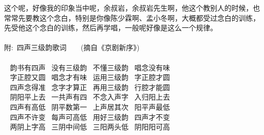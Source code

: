 \textrm{这个呢，好像我的印象当中呢，余叔岩，余叔岩先生啊，他这个教别人的时候，也常常先要教这个念白，特别是你像陈少霖啊、孟小冬啊，大概都受过念白的训练，先受他这个念白的训练，然后再学唱，一般呢好像是这么一个规律。}\\
\\
\vspace{7pt}
{\hei 附:~四声三级韵歌词~~~~(摘自《京剧新序》)}\\%
\vspace{3pt}
{\hei 
\\
\hspace*{50pt}~ 韵书有四声~\hspace{40pt} 没有三级韵~\hspace{40pt} 不懂三级韵~\hspace{40pt} 唱念没有味\\ 
\hspace*{50pt}~ 字正腔又圆~\hspace{40pt} 唱念才有味~\hspace{40pt} 运用三级韵~\hspace{40pt} 字正腔才圆\\ 
\hspace*{50pt}~ 四声念得准~\hspace{40pt} 念字才算正~\hspace{40pt} 再用三级韵~\hspace{40pt} 行腔才能圆\\
\hspace*{50pt}~ 阴阳平上去~\hspace{40pt} 一共声有四~\hspace{40pt} 不念入声字~\hspace{40pt} 入归阳上去\\
\hspace*{50pt}~ 四声有高低~\hspace{40pt} 阴平数第一~\hspace{40pt} 上声居其次~\hspace{40pt} 阳平声最低\\
\hspace*{50pt}~ 四声不许变~\hspace{40pt} 每声可高低~\hspace{40pt} 用好三级韵~\hspace{40pt} 四声才不变\\
\hspace*{50pt}~ 两阴上字高~\hspace{40pt} 三阴中间低~\hspace{40pt} 三阳两头低~\hspace{40pt} 阴阳阳可高\\
}
